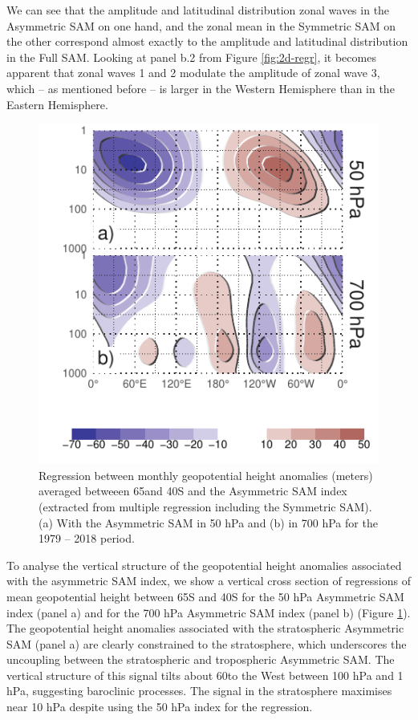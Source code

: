 \documentclass[smallextended]{svjour3}       %
\begin{document}
We can see that the amplitude and latitudinal distribution zonal waves in the Asymmetric SAM on one hand, and the zonal mean in the Symmetric SAM on the other correspond almost exactly to the amplitude and latitudinal distribution in the Full SAM. Looking at panel b.2 from Figure \ref{fig:2d-regr}, it becomes apparent that zonal waves 1 and 2 modulate the amplitude of zonal wave 3, which -- as mentioned before -- is larger in the Western Hemisphere than in the Eastern Hemisphere.

\begin{figure}
\includegraphics{vertical-regression-1} \caption{Regression between monthly geopotential height anomalies (meters) averaged betweeen 65\degree and 40\degree S and the Asymmetric SAM index (extracted from multiple regression including the Symmetric SAM). (a) With the Asymmetric SAM in 50 hPa and (b) in 700 hPa for the 1979 -- 2018 period.}\label{fig:vertical-regression}
\end{figure}

To analyse the vertical structure of the geopotential height anomalies associated with the asymmetric SAM index, we show a vertical cross section of regressions of mean geopotential height between 65\degree S and 40\degree S for the 50 hPa Asymmetric SAM index (panel a) and for the 700 hPa Asymmetric SAM index (panel b) (Figure \ref{fig:vertical-regression}). The geopotential height anomalies associated with the stratospheric Asymmetric SAM (panel a) are clearly constrained to the stratosphere, which underscores the uncoupling between the stratospheric and tropospheric Asymmetric SAM. The vertical structure of this signal tilts about 60\degree to the West between 100 hPa and 1 hPa, suggesting baroclinic processes. The signal in the stratosphere maximises near 10 hPa despite using the 50 hPa index for the regression.
\end{document}
